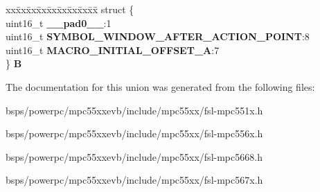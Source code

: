 \begin{DoxyCompactItemize}
\begin{tabbing}
\end{tabbing}\item 
\mbox{\label{unionuPCR6_aae15ecf01d793b9ebc4d9ef3fbfffd61}} 
\begin{tabbing}
xx\=xx\=xx\=xx\=xx\=xx\=xx\=xx\=xx\=\kill
struct \{\\
\>uint16\_t {\bfseries \_\_pad0\_\_}:1\\
\>uint16\_t {\bfseries SYMBOL\_WINDOW\_AFTER\_ACTION\_POINT}:8\\
\>uint16\_t {\bfseries MACRO\_INITIAL\_OFFSET\_A}:7\\
\} {\bfseries B}\\

\end{tabbing}\end{DoxyCompactItemize}


The documentation for this union was generated from the following files\+:\begin{DoxyCompactItemize}
\item 
bsps/powerpc/mpc55xxevb/include/mpc55xx/fsl-\/mpc551x.\+h\item 
bsps/powerpc/mpc55xxevb/include/mpc55xx/fsl-\/mpc556x.\+h\item 
bsps/powerpc/mpc55xxevb/include/mpc55xx/fsl-\/mpc5668.\+h\item 
bsps/powerpc/mpc55xxevb/include/mpc55xx/fsl-\/mpc567x.\+h\end{DoxyCompactItemize}
